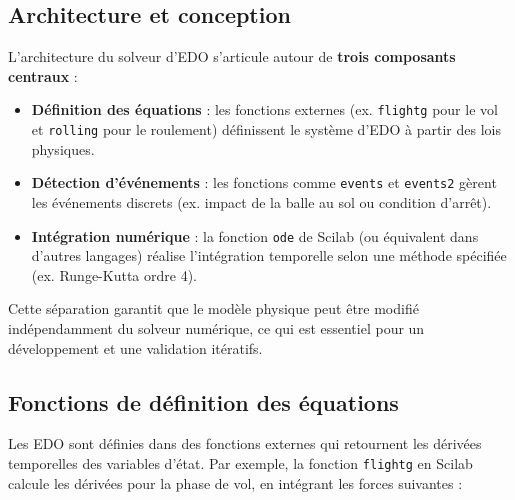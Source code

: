 \documentclass[10pt,a4paper]{report}
\begin{document}
\subsection{Architecture et conception}
\label{subsec:ode_architecture}

L'architecture du solveur d'EDO s'articule autour de \textbf{trois composants centraux} :
\begin{itemize}
    \item \textbf{Définition des équations} : les fonctions externes (ex. \texttt{flightg} pour le vol et \texttt{rolling} pour le roulement) définissent le système d'EDO à partir des lois physiques.
    \item \textbf{Détection d'événements} : les fonctions comme \texttt{events} et \texttt{events2} gèrent les événements discrets (ex. impact de la balle au sol ou condition d'arrêt).
    \item \textbf{Intégration numérique} : la fonction \texttt{ode} de Scilab (ou équivalent dans d'autres langages) réalise l'intégration temporelle selon une méthode spécifiée (ex. Runge-Kutta ordre 4).
\end{itemize}

Cette séparation garantit que le modèle physique peut être modifié indépendamment du solveur numérique, ce qui est essentiel pour un développement et une validation itératifs.


\subsection{Fonctions de définition des équations}
\label{subsec:equation_functions}

Les EDO sont définies dans des fonctions externes qui retournent les dérivées temporelles des variables d'état. Par exemple, la fonction \texttt{flightg} en Scilab calcule les dérivées pour la phase de vol, en intégrant les forces suivantes :
\end{document}

